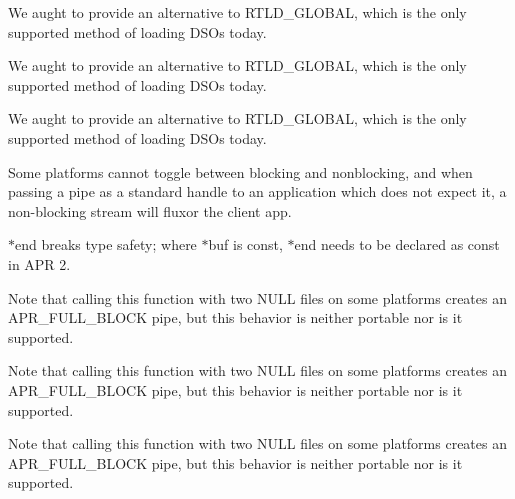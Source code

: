 \begin{DoxyRefList}
\item[\label{bug__bug000010}%
\hypertarget{bug__bug000010}{}%
Global \hyperlink{group__apr__user_ga57b4c6adc3e9d22eeaeb32c8faafcc83}{A\+P\+R\+\_\+\+D\+E\+C\+L\+A\+RE} (apr\+\_\+status\+\_\+t) apr\+\_\+uid\+\_\+current(apr\+\_\+uid\+\_\+t $\ast$userid]We aught to provide an alternative to R\+T\+L\+D\+\_\+\+G\+L\+O\+B\+AL, which is the only supported method of loading D\+S\+Os today.  
\item[\label{bug__bug000010}%
\hypertarget{bug__bug000010}{}%
Global \hyperlink{group__apr__user_ga57b4c6adc3e9d22eeaeb32c8faafcc83}{A\+P\+R\+\_\+\+D\+E\+C\+L\+A\+RE} (apr\+\_\+status\+\_\+t) apr\+\_\+uid\+\_\+current(apr\+\_\+uid\+\_\+t $\ast$userid]We aught to provide an alternative to R\+T\+L\+D\+\_\+\+G\+L\+O\+B\+AL, which is the only supported method of loading D\+S\+Os today.  
\item[\label{bug__bug000010}%
\hypertarget{bug__bug000010}{}%
Global \hyperlink{group__apr__user_ga57b4c6adc3e9d22eeaeb32c8faafcc83}{A\+P\+R\+\_\+\+D\+E\+C\+L\+A\+RE} (apr\+\_\+status\+\_\+t) apr\+\_\+uid\+\_\+current(apr\+\_\+uid\+\_\+t $\ast$userid]We aught to provide an alternative to R\+T\+L\+D\+\_\+\+G\+L\+O\+B\+AL, which is the only supported method of loading D\+S\+Os today.  
\item[\label{bug__bug000012}%
\hypertarget{bug__bug000012}{}%
Global \hyperlink{group__PoolCleanup_ga8f8e9a6584250688c1f6d72252321b54}{A\+P\+R\+\_\+\+D\+E\+C\+L\+A\+RE} )(void) apr\+\_\+pool\+\_\+pre\+\_\+cleanup\+\_\+register(\hyperlink{structapr__pool__t}{apr\+\_\+pool\+\_\+t} $\ast$p]Some platforms cannot toggle between blocking and nonblocking, and when passing a pipe as a standard handle to an application which does not expect it, a non-\/blocking stream will fluxor the client app. 

$\ast$end breaks type safety; where $\ast$buf is const, $\ast$end needs to be declared as const in A\+PR 2. 

Note that calling this function with two N\+U\+LL files on some platforms creates an A\+P\+R\+\_\+\+F\+U\+L\+L\+\_\+\+B\+L\+O\+CK pipe, but this behavior is neither portable nor is it supported.

Note that calling this function with two N\+U\+LL files on some platforms creates an A\+P\+R\+\_\+\+F\+U\+L\+L\+\_\+\+B\+L\+O\+CK pipe, but this behavior is neither portable nor is it supported.

Note that calling this function with two N\+U\+LL files on some platforms creates an A\+P\+R\+\_\+\+F\+U\+L\+L\+\_\+\+B\+L\+O\+CK pipe, but this behavior is neither portable nor is it supported.


\end{DoxyRefList}
